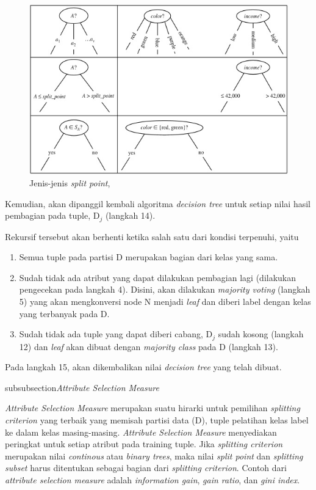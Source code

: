 \begin{figure}
\includegraphics[scale=1]{Gambar/jenishasilsplitpoint.jpg}
\caption[Jenis-jenis \textsl{split point}]{Jenis-jenis \textsl{split point}, \cite{DM}} 
\label{fig:splitPoint}
\end{figure}

Kemudian, akan dipanggil kembali algoritma \textsl{decision tree} untuk setiap nilai hasil pembagian pada tuple, D$_{j}$  (langkah 14).

Rekursif tersebut akan berhenti ketika salah satu dari kondisi terpenuhi, yaitu

\begin{enumerate}
	\item Semua tuple pada partisi D merupakan bagian dari kelas yang sama.
	\item Sudah tidak ada atribut yang dapat dilakukan pembagian lagi (dilakukan pengecekan pada langkah 4). Disini, akan dilakukan \textsl{majority voting} (langkah 5) yang akan mengkonversi node N menjadi \textsl{leaf} dan diberi label dengan kelas yang terbanyak pada D.
	\item Sudah tidak ada tuple yang dapat diberi cabang, D$_{j}$ sudah kosong (langkah 12) dan \textsl{leaf} akan dibuat dengan \textsl{majority class} pada D (langkah 13).
\end{enumerate}

Pada langkah 15, akan dikembalikan nilai \textsl{decision tree} yang telah dibuat.

subsubsection{\textsl{Attribute Selection Measure}}

\textsl{Attribute Selection Measure} merupakan suatu hirarki untuk pemilihan \textsl{splitting criterion} yang terbaik yang memisah partisi data (D), tuple pelatihan kelas label ke dalam kelas masing-masing. \textsl{Attribute Selection Measure} menyediakan peringkat untuk setiap atribut pada training tuple. Jika \textsl{splitting criterion} merupakan nilai \textsl{continous} atau \textsl{binary trees}, maka nilai \textsl{split point} dan \textsl{splitting subset} harus ditentukan sebagai bagian dari \textsl{splitting criterion}. Contoh dari \textsl{attribute selection measure} adalah \textsl{information gain}, \textsl{gain ratio}, dan \textsl{gini index}.

